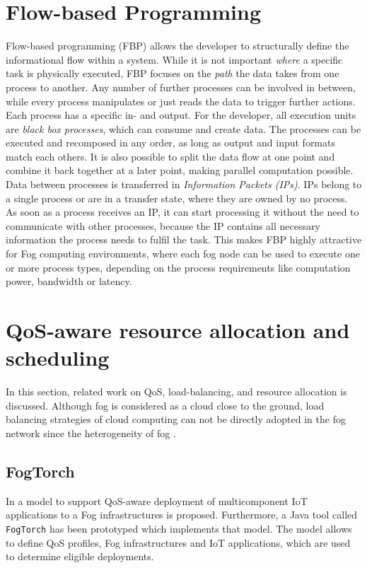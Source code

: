 \section{Flow-based Programming}
Flow-based programming (FBP) allows the developer to structurally deﬁne the informational ﬂow within a system. While it is not important \textit{where} a specific task is physically executed, FBP focuses on the \textit{path} the data takes from one process to another. Any number of further processes can be involved in between, while every process manipulates or just reads the data to trigger further actions. Each process has a specific in- and output. For the developer, all execution units are \textit{black box processes}, which can consume and create data. The processes can be executed and recomposed in any order, as long as output and input formats match each others. It is also possible to split the data flow at one point and combine it back together at a later point, making parallel computation possible.\\

Data between processes is transferred in \textit{Information Packets (IPs)}. IPs belong to a single process or are in a transfer state, where they are owned by no process. As soon as a process receives an IP, it can start processing it without the need to communicate with other processes, because the IP contains all necessary information the process needs to fulfil the task. This makes FBP highly attractive for Fog computing environments, where each fog node can be used to execute one or more process types, depending on the process requirements like computation power, bandwidth or latency.

\section{QoS-aware resource allocation and scheduling}
In this section, related work on QoS, load-balancing, and resource allocation is discussed. Although fog is considered as a cloud close to the ground, load balancing strategies of cloud computing can not be directly adopted in the fog network since the heterogeneity of fog \cite{novel-load-balancing}.

\subsection{FogTorch}
In \cite{fogtorch} a model to support QoS-aware deployment of multicomponent IoT applications to a Fog infrastructures is proposed. Furthermore, a Java tool called \texttt{FogTorch} has been prototyped which implements that model. The model allows to define QoS profiles, Fog infrastructures and IoT applications, which are used to determine eligible deployments.\\

